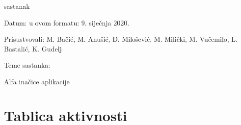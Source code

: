 \begin{packed_enum}
			\item  sastanak
			\item[] \begin{packed_item}
				\item Datum: u ovom formatu: 9. siječnja 2020.
				\item Prisustvovali:  M. Bačić, M. Anušić, D. Milošević, M. Milički, M. Vučemilo, L. Bastalić, K. Gudelj
				\item Teme sastanka:
				\begin{packed_item}
					\item  Alfa inačice aplikacije
				\end{packed_item}
			\end{packed_item}
			
			
		\end{packed_enum}
		
		\eject
		\section*{Tablica aktivnosti}
		

